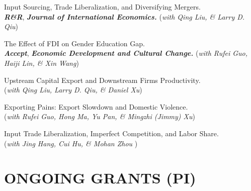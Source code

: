 \documentclass{res}
\begin{document}
\begin{resume}
 \vspace{0.8em}
 
  Input Sourcing, Trade Liberalization, and Diversifying Mergers.  \\
  {\bf \em R\&R}, {\em \textbf{Journal of International Economics.}} ({\em with Qing Liu, \& Larry D. Qiu}) \\
 
   \vspace{-1.6em} 

The Effect of FDI on Gender Education Gap. \\
{\bf \em Accept}, {\em \textbf{Economic Development and Cultural Change.}} ({\em with Rufei Guo, Haiji Lin, \& Xin Wang}) \\
 \vspace{-1.6em} 
 
 
 Upstream Capital Export and Downstream Firms Productivity. \\({\em with Qing Liu,  Larry D. Qiu, \& Daniel Xu})  \\
 \vspace{-1.6em} 
 
 Exporting Pains: Export Slowdown and Domestic Violence. \\({\em with Rufei Guo, Hong Ma, Yu Pan, \& Mingzhi (Jimmy) Xu}) \\
  \vspace{-1.6em} 
  
 Input Trade Liberalization, Imperfect Competition, and Labor Share. \\
({\em with Jing Hang, Cui Hu, \& Mohan Zhou }) \\


  \vspace{-1.6em} 
  
 
 





 \section{ONGOING GRANTS (PI)}    
 \vspace{0.8em}  
 

\end{resume}
\end{document}
